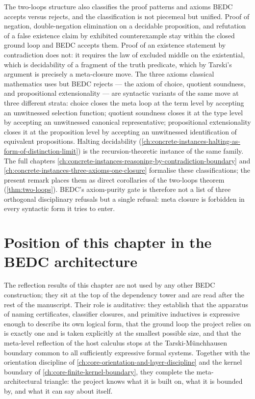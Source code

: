 \begin{remark}
\label{rem:reasoning-and-axioms-as-meta-closure}
The two-loops structure also classifies the proof patterns and axioms BEDC accepts versus rejects, and the classification is not piecemeal but unified. Proof of negation, double-negation elimination on a decidable proposition, and refutation of a false existence claim by exhibited counterexample stay within the closed ground loop and BEDC accepts them. Proof of an existence statement by contradiction does not: it requires the law of excluded middle on the existential, which is decidability of a fragment of the truth predicate, which by Tarski's argument is precisely a meta-closure move. The three axioms classical mathematics uses but BEDC rejects --- the axiom of choice, quotient soundness, and propositional extensionality --- are syntactic variants of the same move at three different strata: choice closes the meta loop at the term level by accepting an unwitnessed selection function; quotient soundness closes it at the type level by accepting an unwitnessed canonical representative; propositional extensionality closes it at the proposition level by accepting an unwitnessed identification of equivalent propositions. Halting decidability (\autoref{ch:concrete-instances-halting-as-form-of-distinction-limit}) is the recursion-theoretic instance of the same family. The full chapters \autoref{ch:concrete-instances-reasoning-by-contradiction-boundary} and \autoref{ch:concrete-instances-three-axioms-one-closure} formalise these classifications; the present remark places them as direct corollaries of the two-loops theorem (\autoref{thm:two-loops}). BEDC's axiom-purity gate is therefore not a list of three orthogonal disciplinary refusals but a single refusal: meta closure is forbidden in every syntactic form it tries to enter.
\end{remark}

\section{Position of this chapter in the BEDC architecture}
\label{sec:reflection-position}

The reflection results of this chapter are not used by any other BEDC construction; they sit at the top of the dependency tower and are read after the rest of the manuscript. Their role is auditative: they establish that the apparatus of naming certificates, classifier closures, and primitive inductives is expressive enough to describe its own logical form, that the ground loop the project relies on is exactly one and is taken explicitly at the smallest possible size, and that the meta-level reflection of the host calculus stops at the Tarski-M\"unchhausen boundary common to all sufficiently expressive formal systems. Together with the orientation discipline of \autoref{ch:core-orientation-and-layer-discipline} and the kernel boundary of \autoref{ch:core-finite-kernel-boundary}, they complete the meta-architectural triangle: the project knows what it is built on, what it is bounded by, and what it can say about itself.

